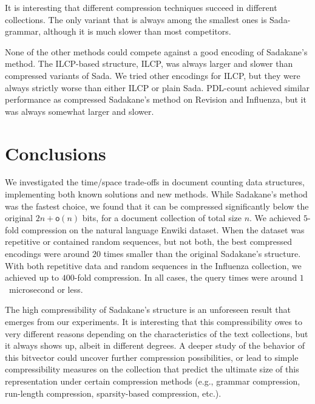 \documentclass[11pt]{llncs}
\newcommand{\oh}{\ensuremath{\mathsf{o}}}
\newcommand{\PDLcount}{\textsf{PDL-count}} \newcommand{\SadaR}{\textsf{Sada-RR}} \newcommand{\SadaPG}{\textsf{Sada-P-G}} \newcommand{\SadaPR}{\textsf{Sada-P-RR}} \newcommand{\SadaRG}{\textsf{Sada-RR-G}} \newcommand{\SadaRR}{\textsf{Sada-RR-RR}} \newcommand{\SadaG}{\textsf{Sada-grammar}} \newcommand{\sada}{\textsf{Sada}} \newcommand{\sadaR}{\textsf{Sada-RS}} \newcommand{\sadaRS}{\textsf{Sada-RS-S}} \newcommand{\sadaD}{\textsf{Sada-RD}} \newcommand{\sadaDS}{\textsf{Sada-RD-S}} \newcommand{\sadaS}{\textsf{Sada-S-S}} \newcommand{\sadaSS}{\textsf{Sada-S}} \newcommand{\wt}{\textsf{ILCP}}
\newcommand{\Enwiki}{\textsf{Enwiki}}
\newcommand{\Revision}{\textsf{Revision}}
\newcommand{\Influenza}{\textsf{Influenza}}
\begin{document}
It is interesting that different compression techniques succeed in different
collections. The only variant that is always among the smallest ones is
\SadaG, although it is much slower than most competitors.

None of the other methods could compete against a good encoding of Sadakane's method. The ILCP-based structure, \wt, was always larger and slower than compressed variants of \sada. We tried other encodings for ILCP, but they were always strictly worse than either \wt{} or plain \sada. \PDLcount{} achieved similar performance as compressed Sadakane's method on \Revision{} and \Influenza{}, but it was always somewhat larger and slower.


\section{Conclusions}\label{section:conclusions}

We investigated the time/space trade-offs in document counting data structures, implementing both known solutions and new methods. While Sadakane's method was the fastest choice, we found that it can be compressed significantly below the original $2n + \oh(n)$ bits, for a document collection of total size $n$. We achieved $5$\nobreakdash-fold compression on the natural language \Enwiki{} dataset. When the dataset was repetitive or contained random sequences, but not both, the best compressed encodings were around $20$ times smaller than the original Sadakane's structure. With both repetitive data and random sequences in the \Influenza{} collection, we achieved up to $400$\nobreakdash-fold compression. In all cases, the query times were around $1$~microsecond or less.

The high compressibility of Sadakane's structure is an unforeseen result that
emerges from our experiments. It is interesting that this compressibility owes
to very different reasons depending on the characteristics of the text
collections, but it always shows up, albeit in different degrees. 
A deeper study of the behavior of this
bitvector could uncover further compression possibilities, or lead to simple
compressibility measures on the collection that predict the ultimate size of
this representation under certain compression methods (e.g., grammar
compression, run-length compression, sparsity-based compression, etc.).

\clearpage



\end{document}
